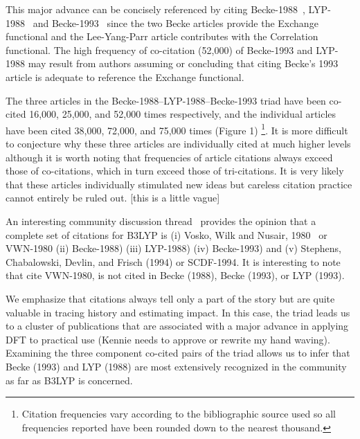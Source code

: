 \documentclass[notitlepage]{report}
\begin{document}
This major advance can be concisely referenced by citing Becke-1988~\citep{becke1988density}, LYP-1988~\citep{lyp1988} and Becke-1993~\citep{becke1993dft} since the two Becke articles provide the Exchange functional and the Lee-Yang-Parr article contributes with the Correlation functional. The high frequency of co-citation (52,000) of Becke-1993 and LYP-1988 may result from authors assuming or concluding that citing Becke's 1993 article is adequate to reference the Exchange functional. 

The three articles in the Becke-1988--LYP-1988--Becke-1993 triad have been co-cited 16,000, 25,000, and 52,000 times respectively, and the individual articles have been cited 38,000, 72,000, and 75,000 times (Figure 1) \footnote{Citation frequencies vary according to the bibliographic source used so all frequencies reported have been rounded down to the nearest thousand.}. It is more difficult to conjecture why these three articles are individually cited at much higher levels although it is worth noting that  frequencies of article citations always exceed those of co-citations, which in turn exceed those of tri-citations. It is very likely that these articles individually stimulated new ideas but careless citation practice cannot entirely be ruled out. [this is a little vague]

An interesting community discussion thread~\citep{johansson2002} provides the opinion that a complete set of citations for B3LYP is (i) Vosko, Wilk and Nusair, 1980~\citep{vosko1980accurate} or VWN-1980 (ii) Becke-1988) (iii) LYP-1988) (iv) Becke-1993) and (v) Stephens, Chabalowski, Devlin, and Frisch (1994) or SCDF-1994. It is interesting to note that  cite VWN-1980, is not cited in Becke (1988), Becke (1993), or LYP (1993). 

We emphasize that citations always tell only a part of the story but are quite valuable in tracing history and estimating impact. In this case, the triad leads us to a cluster of publications that are associated with a major advance in applying DFT to practical use (Kennie needs to approve or rewrite my hand waving). Examining the three component co-cited pairs of the triad allows us to infer that Becke (1993) and LYP (1988) are most extensively recognized 
in the community as far as B3LYP is concerned. 



\end{document}
